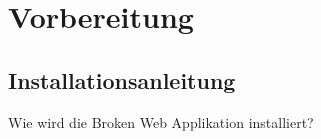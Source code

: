 \chapter{Vorbereitung}

\section{Installationsanleitung}

Wie wird die Broken Web Applikation installiert?\\\\


